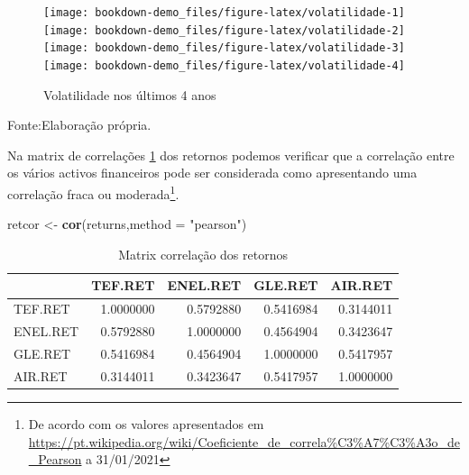 \documentclass[
  12pt,
  a4paper,
  openany]{book}
\newenvironment{Shaded}{\begin{snugshade}}{\end{snugshade}}
\newcommand{\DataTypeTok}[1]{\textcolor[rgb]{0.13,0.29,0.53}{#1}}
\newcommand{\KeywordTok}[1]{\textcolor[rgb]{0.13,0.29,0.53}{\textbf{#1}}}
\newcommand{\NormalTok}[1]{#1}
\newcommand{\StringTok}[1]{\textcolor[rgb]{0.31,0.60,0.02}{#1}}
\begin{document}
\normalsize

\begin{figure}

{\centering \texttt{[image: bookdown-demo\_files/figure-latex/volatilidade-1]} \texttt{[image: bookdown-demo\_files/figure-latex/volatilidade-2]} \texttt{[image: bookdown-demo\_files/figure-latex/volatilidade-3]} \texttt{[image: bookdown-demo\_files/figure-latex/volatilidade-4]} 

}

\caption{Volatilidade nos últimos 4 anos}\label{fig:volatilidade}
\end{figure}
\FloatBarrier
\centering

Fonte:Elaboração própria.

\justifying
\bigskip

Na matrix de correlações \ref{tab:correl} dos retornos podemos verificar que a correlação entre os vários activos financeiros pode ser considerada como apresentando uma correlação fraca ou moderada\footnote{De acordo com os valores apresentados em \url{https://pt.wikipedia.org/wiki/Coeficiente_de_correla\%C3\%A7\%C3\%A3o_de_Pearson} a 31/01/2021}.

\scriptsize

\begin{Shaded}
\begin{Highlighting}[]
\NormalTok{retcor \textless{}{-}}\StringTok{ }\KeywordTok{cor}\NormalTok{(returns,}\DataTypeTok{method =} \StringTok{"pearson"}\NormalTok{)}
\end{Highlighting}
\end{Shaded}

\normalsize

\begin{table}[!h]

\caption{\label{tab:correl}Matrix correlação dos retornos}
\centering
\begin{tabular}[t]{lrrrr}
\toprule
  & TEF.RET & ENEL.RET & GLE.RET & AIR.RET\\
\midrule
TEF.RET & 1.0000000 & 0.5792880 & 0.5416984 & 0.3144011\\
ENEL.RET & 0.5792880 & 1.0000000 & 0.4564904 & 0.3423647\\
GLE.RET & 0.5416984 & 0.4564904 & 1.0000000 & 0.5417957\\
AIR.RET & 0.3144011 & 0.3423647 & 0.5417957 & 1.0000000\\
\bottomrule
\end{tabular}
\end{table}
\FloatBarrier
\centering
\end{document}
